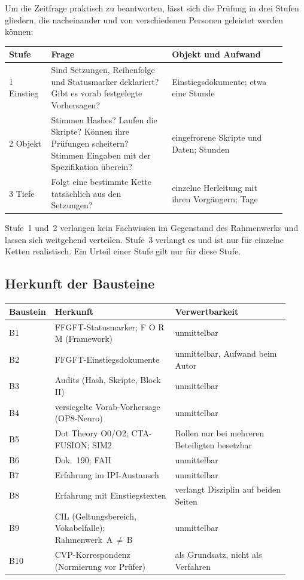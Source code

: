 Um die Zeitfrage praktisch zu beantworten, lässt sich die Prüfung in drei Stufen
gliedern, die nacheinander und von verschiedenen Personen geleistet werden können:
\begin{center}
\small
\begin{tabular}{@{}p{0.14\linewidth}p{0.40\linewidth}p{0.38\linewidth}@{}}
\toprule
\textbf{Stufe} & \textbf{Frage} & \textbf{Objekt und Aufwand} \\
\midrule
1 Einstieg & Sind Setzungen, Reihenfolge und Statusmarker deklariert? Gibt es vorab festgelegte Vorhersagen? &
  Einstiegsdokumente; etwa eine Stunde \\
2 Objekt & Stimmen Hashes? Laufen die Skripte? Können ihre Prüfungen scheitern? Stimmen Eingaben mit der Spezifikation überein? &
  eingefrorene Skripte und Daten; Stunden \\
3 Tiefe & Folgt eine bestimmte Kette tatsächlich aus den Setzungen? &
  einzelne Herleitung mit ihren Vorgängern; Tage \\
\bottomrule
\end{tabular}
\end{center}
Stufe~1 und~2 verlangen kein Fachwissen im Gegenstand des Rahmenwerks und lassen sich
weitgehend verteilen. Stufe~3 verlangt es und ist nur für einzelne Ketten realistisch.
Ein Urteil einer Stufe gilt nur für diese Stufe.

\subsection{Herkunft der Bausteine}

\begin{center}
\small
\begin{tabular}{@{}p{0.11\linewidth}p{0.42\linewidth}p{0.40\linewidth}@{}}
\toprule
\textbf{Baustein} & \textbf{Herkunft} & \textbf{Verwertbarkeit} \\
\midrule
B1 & FFGFT-Statusmarker; F O R M (Framework) & unmittelbar \\
B2 & FFGFT-Einstiegsdokumente & unmittelbar, Aufwand beim Autor \\
B3 & Audits (Hash, Skripte, Block II) & unmittelbar \\
B4 & versiegelte Vorab-Vorhersage (OP8-Neuro) & unmittelbar \\
B5 & Dot Theory O0/O2; CTA-FUSION; SIM2 & Rollen nur bei mehreren Beteiligten besetzbar \\
B6 & Dok.~190; FAH & unmittelbar \\
B7 & Erfahrung im IPI-Austausch & unmittelbar \\
B8 & Erfahrung mit Einstiegstexten & verlangt Disziplin auf beiden Seiten \\
B9 & CIL (Geltungsbereich, Vokabelfalle); Rahmenwerk~A\,$\neq$\,B & unmittelbar \\
B10 & CVP-Korrespondenz (Normierung vor Prüfer) & als Grundsatz, nicht als Verfahren \\
\bottomrule
\end{tabular}
\end{center}

